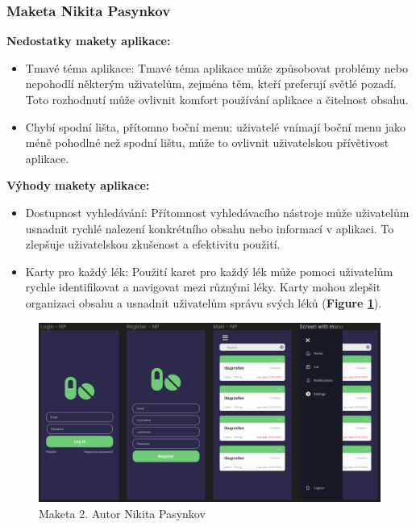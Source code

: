 \documentclass[a4paper, 11pt]{article}
\begin{document}
   \subsubsection{Maketa Nikita Pasynkov}
\noindent \textbf{Nedostatky makety aplikace:}
   \begin{itemize}
       \item Tmavé téma aplikace: Tmavé téma aplikace může způsobovat problémy nebo nepohodlí některým uživatelům, zejména těm, kteří preferují světlé pozadí. Toto rozhodnutí může ovlivnit komfort používání aplikace a čitelnost obsahu.
       \item Chybí spodní lišta, přítomno boční menu: uživatelé vnímají boční menu jako méně pohodlné než spodní lištu, může to ovlivnit uživatelskou přívětivost aplikace.
   \end{itemize}
   \textbf{Výhody  makety aplikace:}
   \begin{itemize}
       \item Dostupnost vyhledávání: Přítomnost vyhledávacího nástroje může uživatelům usnadnit rychlé nalezení konkrétního obsahu nebo informací v aplikaci. To zlepšuje uživatelskou zkušenost a efektivitu použití.
       \item Karty pro každý lék: Použití karet pro každý lék může pomoci uživatelům rychle identifikovat a navigovat mezi různými léky. Karty mohou zlepšit organizaci obsahu a usnadnit uživatelům správu svých léků (\textbf {Figure \ref{figure:maketa2}}).
   \end{itemize}
   \begin{figure}[!ht]
		\centering	\includegraphics[width=\textwidth,height=\textheight,keepaspectratio]{Maketa_NP.png}
		\caption{Maketa 2. Autor Nikita Pasynkov}
		\label{figure:maketa2}
	\end{figure}
 \FloatBarrier
\end{document}
